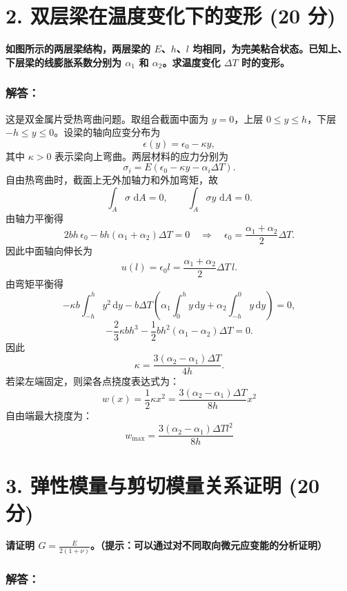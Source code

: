\documentclass[11pt,a4paper]{ctexrep}
\newcommand{\diff}{\,\mathrm{d}}
\begin{document}
{%


\section*{2. 双层梁在温度变化下的变形 (20 分)}

\textbf{如图所示的两层梁结构，两层梁的 $E$、$h$、$l$ 均相同，为完美粘合状态。已知上、下层梁的线膨胀系数分别为 $\alpha_1$ 和 $\alpha_2$。求温度变化 $\Delta T$ 时的变形。}

\subsubsection*{解答：}

这是双金属片受热弯曲问题。取组合截面中面为 $y=0$，上层 $0\le y\le h$，下层 $-h\le y\le0$。设梁的轴向应变分布为
\[
    \epsilon(y)=\epsilon_0-\kappa y,
\]
其中 $\kappa>0$ 表示梁向上弯曲。两层材料的应力分别为
\[
    \sigma_i=E\left(\epsilon_0-\kappa y-\alpha_i\Delta T\right).
\]
自由热弯曲时，截面上无外加轴力和外加弯矩，故
\[
    \int_A \sigma\,\diff A=0,\qquad \int_A \sigma y\,\diff A=0.
\]
由轴力平衡得
\[
    2bh\,\epsilon_0-bh(\alpha_1+\alpha_2)\Delta T=0
    \quad\Rightarrow\quad
    \epsilon_0=\frac{\alpha_1+\alpha_2}{2}\Delta T.
\]
因此中面轴向伸长为
\[
    u(l)=\epsilon_0l=\frac{\alpha_1+\alpha_2}{2}\Delta T\,l.
\]
由弯矩平衡得
\[
    -\kappa b\int_{-h}^{h}y^2\diff y
    -b\Delta T\left(\alpha_1\int_0^h y\diff y+\alpha_2\int_{-h}^0 y\diff y\right)=0,
\]
\[
    -\frac{2}{3}\kappa b h^3-\frac12 b h^2(\alpha_1-\alpha_2)\Delta T=0.
\]
因此
\[
    \kappa=\frac{3(\alpha_2-\alpha_1)\Delta T}{4h}.
\]
若梁左端固定，则梁各点挠度表达式为：
\[
w(x) = \frac{1}{2} \kappa x^2 = \frac{3(\alpha_2 - \alpha_1) \Delta T}{8 h} x^2
\]
自由端最大挠度为：
\[
w_{\max} = \frac{3(\alpha_2 - \alpha_1) \Delta T l^2}{8 h}
\]




\section*{3. 弹性模量与剪切模量关系证明 (20 分)}

\textbf{请证明 $G=\frac{E}{2(1+\nu)}$。（提示：可以通过对不同取向微元应变能的分析证明）}

\subsubsection*{解答：}

}
\end{document}
